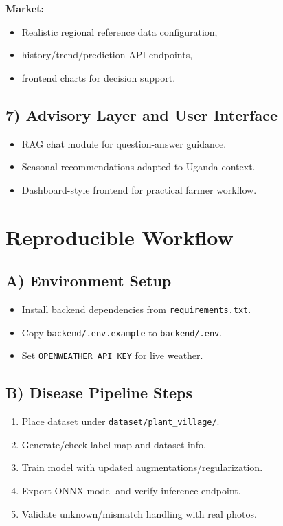 \documentclass[11pt,a4paper]{article}
\begin{document}
\textbf{Market:}
\begin{itemize}[noitemsep]
  \item Realistic regional reference data configuration,
  \item history/trend/prediction API endpoints,
  \item frontend charts for decision support.
\end{itemize}

\subsection{7) Advisory Layer and User Interface}
\begin{itemize}[noitemsep]
  \item RAG chat module for question-answer guidance.
  \item Seasonal recommendations adapted to Uganda context.
  \item Dashboard-style frontend for practical farmer workflow.
\end{itemize}
\section{Reproducible Workflow}
\subsection{A) Environment Setup}
\begin{itemize}[noitemsep]
  \item Install backend dependencies from \texttt{requirements.txt}.
  \item Copy \texttt{backend/.env.example} to \texttt{backend/.env}.
  \item Set \texttt{OPENWEATHER\_API\_KEY} for live weather.
\end{itemize}

\subsection{B) Disease Pipeline Steps}
\begin{enumerate}[noitemsep]
  \item Place dataset under \texttt{dataset/plant\_village/}.
  \item Generate/check label map and dataset info.
  \item Train model with updated augmentations/regularization.
  \item Export ONNX model and verify inference endpoint.
  \item Validate unknown/mismatch handling with real photos.
\end{enumerate}
\end{document}
